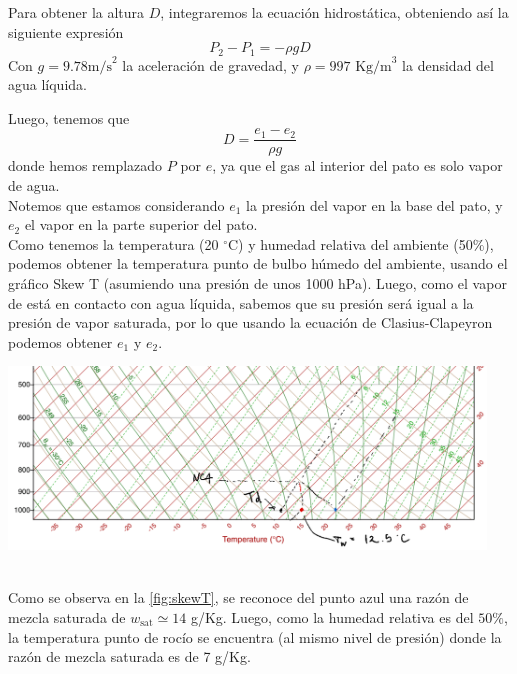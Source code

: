 \documentclass[../main.tex]{subfiles}
\begin{document}
    Para obtener la altura $D$, integraremos la ecuación hidrostática, obteniendo así la siguiente expresión
    \begin{equation}
        P_2 - P_1 = -\rho g D
    \end{equation}
Con $g = 9.78 \text{m/s}^{2}$ la aceleración de gravedad, y $\rho = 997 \text{ Kg/m}^3$ la densidad del agua líquida.

Luego, tenemos que 
\begin{equation}
    D = \frac{e_1-e_2}{\rho g} \label{D}
\end{equation}
donde hemos remplazado $P$ por $e$, ya que el gas al interior del pato es solo vapor de agua.\\

Notemos que estamos considerando $e_1$ la presión del vapor en la base del pato, y $e_2$ el vapor en la parte superior del pato.\\

Como tenemos la temperatura (20 $^\circ$C) y humedad relativa del ambiente (50$\%$), podemos obtener la temperatura punto de bulbo húmedo del ambiente, usando el gráfico Skew T (asumiendo una presión de unos 1000 hPa). Luego, como el vapor de está en contacto con agua líquida, sabemos que su presión será igual a la presión de vapor saturada, por lo que usando la ecuación de Clasius-Clapeyron podemos obtener $e_1$ y $e_2$.\\

\begin{minipage}{\linewidth}
    \centering
        \includegraphics[width=0.95\textwidth]{img/skewT}
        \label{fig:skewT}
\end{minipage}\\

Como se observa en la \autoref{fig:skewT}, se reconoce del punto azul una razón de mezcla saturada de $w_\text{sat} \simeq 14$ g/Kg. Luego, como la humedad relativa es del $50\%$, la temperatura punto de rocío se encuentra (al mismo nivel de presión) donde la razón de mezcla saturada es de 7 g/Kg. \\
\end{document}
